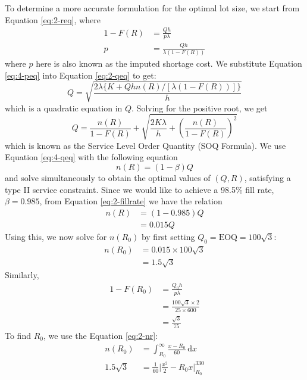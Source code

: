 \documentclass[12pt]{article}
\begin{document}
To determine a more accurate formulation for the optimal lot size, we start from Equation \ref{eq:2-req}, where \begin{align}\nonumber
    1- F(R) &= \frac{Qh}{p\lambda} \\ \label{eq:4-peq}
    p &= \frac{Qh}{\lambda(1-F(R))}
\end{align} where $p$ here is also known as the imputed shortage cost. We substitute Equation \ref{eq:4-peq} into Equation \ref{eq:2-qeq} to get: \begin{equation*}
    Q = \sqrt{ \frac{2\lambda \{K + Qhn(R) / [\lambda(1-F(R))]\}}{h}}
\end{equation*} which is a quadratic equation in $Q$. Solving for the positive root, we get \begin{equation}\label{eq:4-qeq}
    Q = \frac{n(R)}{1 - F(R)} + \sqrt{ \frac{2 K\lambda }{h} + \left( \frac{n(R)}{1-F(R)} \right)^{2}}
\end{equation} which is known as the Service Level Order Quantity (SOQ Formula). We use Equation \ref{eq:4-qeq} with the following equation \begin{equation}\label{eq:4-nreq}
    n(R) = (1-\beta)Q 
\end{equation} and solve simultaneously to obtain the optimal values of $(Q,R)$, satisfying a type II service constraint. Since we would like to achieve a 98.5\% fill rate, $\beta = 0.985$, from Equation \ref{eq:2-fillrate} we have the relation \begin{align*}
    n(R) &= (1-0.985)Q \\ 
    &= 0.015Q
\end{align*} Using this, we now solve for $n(R_{0})$ by first setting $Q_{0} = \text{EOQ} = 100\sqrt{3}$: \begin{align*}
    n(R_{0}) &= 0.015 \times 100\sqrt{3} \\ 
    &= 1.5\sqrt{3}
\end{align*} Similarly, \begin{align*}
    1-F(R_{0}) &= \frac{Q_{0} h}{p\lambda} \\
    &= \frac{100\sqrt{3}\times 2}{25 \times 600} \\ 
    &= \frac{\sqrt{3}}{75}
\end{align*} To find $R_{0}$, we use the Equation \ref{eq:2-nr}: \begin{align*}
    n(R_{0}) &= \int_{R_{0}}^{\infty} \frac{x-R_{0}}{60} \, \mathrm{d}x \\ 
    1.5\sqrt{3} &= \frac{1}{60} \Big| \frac{x^{2}}{2} - R_{0}x \Big|^{330}_{R_{0}} \\ 

\end{align*}
\end{document}
